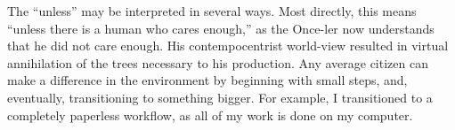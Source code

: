\documentclass[12pt]{article}
\begin{document}
\begin{enumerate}
\begin{justify}
      The “unless” may be interpreted in several ways. Most directly, this means “unless there is a human who cares enough,” as the Once-ler now understands that he did not care enough. His contempocentrist world-view resulted in virtual annihilation of the trees necessary to his production. Any average citizen can make a difference in the environment by beginning with small steps, and, eventually, transitioning to something bigger. For example, I transitioned to a completely paperless workflow, as all of my work is done on my computer.

    \end{justify}

\end{enumerate}
\end{document}

